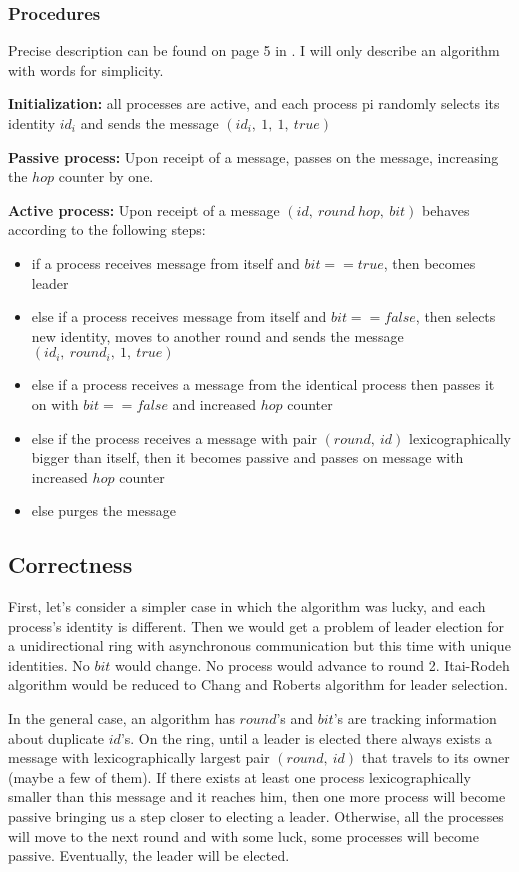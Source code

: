 \documentclass{article}
\begin{document}
\subsubsection*{Procedures}
Precise description can be found on page 5 in \cite{fokkink2005simplifying}. I will only describe an algorithm with words for simplicity.

\textbf{Initialization:} all processes are active, and each process pi randomly selects its identity $id_i$ and sends the message $(id_i,\ 1,\ 1,\ true)$

\textbf{Passive process:} Upon receipt of a message, passes on the message, increasing the $hop$ counter by one.

\textbf{Active process:} Upon receipt of a message $(id,\ round\ hop,\ bit)$ behaves according to the following steps:
\begin{itemize}
    \item if a process receives message from itself and $bit == true$, then becomes leader
    \item else if a process receives message from itself and $bit == false$, then selects new identity, moves to another round and sends the message $(id_i,\ round_i,\ 1,\ true)$
    \item else if a process receives a message from the identical process then passes it on with $bit == false$ and increased $hop$ counter
    \item else if the process receives a message with pair $(round,\ id)$ lexicographically bigger than itself, then it becomes passive and passes on message with increased $hop$ counter
    \item else purges the message
\end{itemize}

\clearpage

\subsection*{Correctness}
First, let's consider a simpler case in which the algorithm was lucky, and each process's identity is different. Then we would get a problem of leader election for a unidirectional ring with asynchronous communication but this time with unique identities. No $bit$ would change. No process would advance to round 2. Itai-Rodeh algorithm would be reduced to Chang and Roberts algorithm for leader selection.

In the general case, an algorithm has $round$'s and $bit$'s are tracking information about duplicate $id$'s.  On the ring, until a leader is elected there always exists a message with lexicographically largest pair $(round,\ id)$ that travels to its owner (maybe a few of them). If there exists at least one process lexicographically smaller than this message and it reaches him, then one more process will become passive bringing us a step closer to electing a leader. Otherwise, all the processes will move to the next round and with some luck, some processes will become passive. Eventually, the leader will be elected. 
\end{document}
